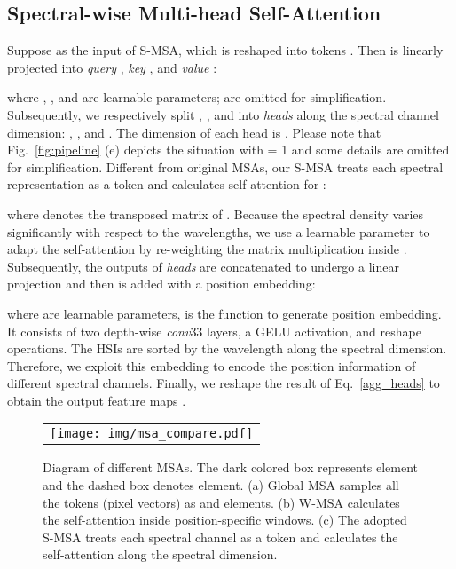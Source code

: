 \documentclass[10pt,twocolumn,letterpaper]{article}
\begin{document}
\subsection{Spectral-wise Multi-head Self-Attention}
Suppose  as the input of S-MSA, which is reshaped into tokens . Then  is linearly projected into \emph{query} , \emph{key} , and \emph{value} : 
\vspace{0.2mm}

where , , and  are learnable parameters;  are omitted for simplification. Subsequently, we respectively split , , and  into  \emph{heads} along the spectral channel dimension: , , and . The dimension of each head is . Please note that Fig.~\ref{fig:pipeline} (e) depicts the situation with  = 1 and some details are omitted for simplification. Different from original MSAs, our S-MSA treats each spectral representation as a token and calculates self-attention for :
\vspace{-0.2mm}

where  denotes the transposed matrix of . Because the spectral density varies significantly with respect to the wavelengths, we use a learnable parameter  to adapt the self-attention  by re-weighting the matrix multiplication  inside . Subsequently, the outputs of  \emph{heads} are concatenated to undergo a linear projection and then is added with a position embedding:

where  are learnable parameters,  is the function to generate position embedding. It consists of two depth-wise \emph{conv}33 layers, a GELU activation, and reshape operations. The HSIs are sorted by the wavelength along the spectral dimension. Therefore, we exploit this embedding to encode the position information of different spectral channels. Finally, we reshape the result of Eq.~\eqref{agg_heads} to obtain the output feature maps . 



\begin{figure*}[t]
	\begin{center}
		\begin{tabular}[t]{c} \hspace{-2mm} 
			\texttt{[image: img/msa\_compare.pdf]}
		\end{tabular}
	\end{center}
	\vspace{-5mm}
	\caption{\small Diagram of different MSAs. The dark colored box represents  element and the dashed box denotes  element. (a) Global MSA samples all the tokens (pixel vectors) as  and  elements. (b) W-MSA calculates the self-attention inside position-specific windows. (c) The adopted S-MSA treats each spectral channel as a token and calculates the self-attention along the spectral dimension. }
	\label{fig:attan_compare}
	\vspace{-1mm}
\end{figure*}
\end{document}

